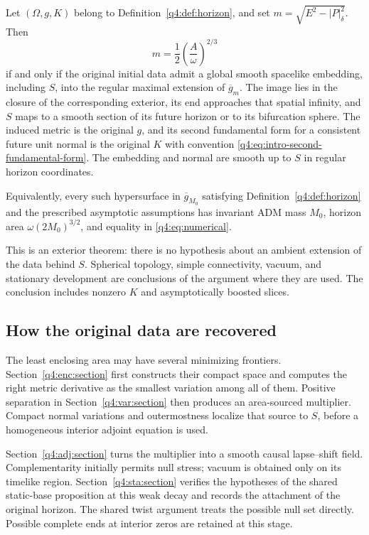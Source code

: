 \begin{theorem}\label{q4:thm:rigidity}
Let $(\Omega,g,K)$ belong to Definition~\ref{q4:def:horizon}, and set
$m=\sqrt{E^2-|P|_\delta^2}$. Then
\begin{equation}\label{q4:eq:intro-equality}
 m=\frac12\left(\frac A\omega\right)^{2/3}
\end{equation}
if and only if the original initial data admit a global smooth spacelike
embedding, including $S$, into the regular maximal extension of
$\overline g_m$. The image lies in the closure of the corresponding
exterior, its end approaches that spatial infinity, and $S$ maps to a
smooth section of its future horizon or to its bifurcation sphere.
The induced metric is the original $g$, and its second fundamental form
for a consistent future unit normal is the original $K$ with convention
\eqref{q4:eq:intro-second-fundamental-form}. The embedding and normal are
smooth up to $S$ in regular horizon coordinates.

Equivalently, every such hypersurface in $\overline g_{M_0}$ satisfying
Definition~\ref{q4:def:horizon} and the prescribed asymptotic assumptions
has invariant ADM mass $M_0$, horizon area
$\omega(2M_0)^{3/2}$, and equality in \eqref{q4:eq:numerical}.
\end{theorem}

This is an exterior theorem: there is no hypothesis about an ambient
extension of the data behind $S$. Spherical topology, simple
connectivity, vacuum, and stationary development are conclusions of the
argument where they are used. The conclusion includes nonzero $K$ and
asymptotically boosted slices.

\subsection{How the original data are recovered}

The least enclosing area may have several minimizing frontiers.
Section~\ref{q4:enc:section} first constructs their compact space and
computes the right metric derivative as the smallest variation among
all of them. Positive separation in Section~\ref{q4:var:section} then
produces an area-sourced multiplier. Compact normal variations and
outermostness localize that source to $S$, before a homogeneous interior
adjoint equation is used.

Section~\ref{q4:adj:section} turns the multiplier into a smooth causal
lapse--shift field. Complementarity initially permits null stress;
vacuum is obtained only on its timelike region.
Section~\ref{q4:sta:section} verifies the hypotheses of the shared
static-base proposition at this weak decay and records the attachment
of the original horizon. The shared twist argument treats the possible
null set directly. Possible complete ends at interior zeros are retained
at this stage.

